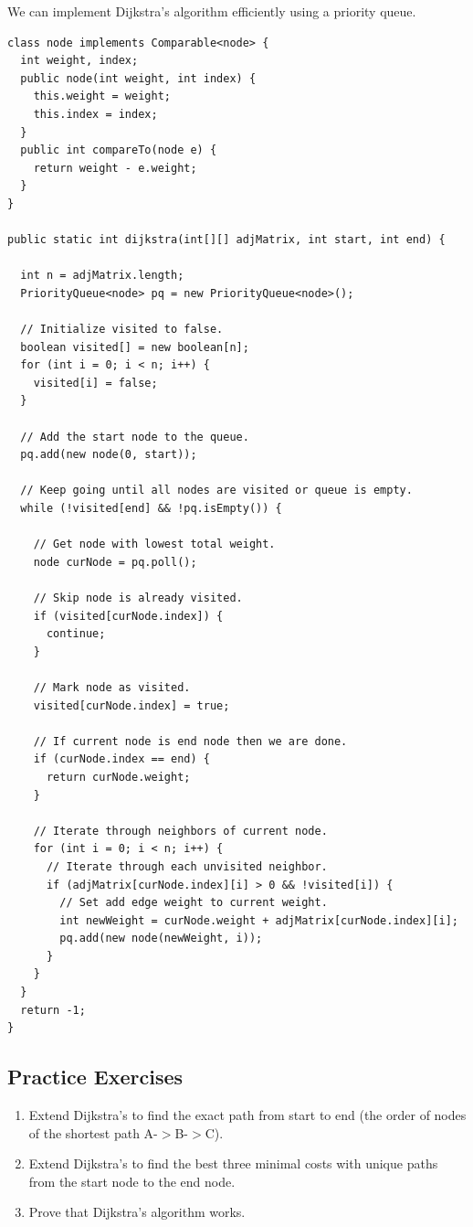 \documentclass[11pt,oneside]{book}
\begin{document}
We can implement Dijkstra's algorithm efficiently using a priority queue.

\begin{lstlisting}
class node implements Comparable<node> {
  int weight, index;
  public node(int weight, int index) {
    this.weight = weight;
    this.index = index;
  }
  public int compareTo(node e) {
    return weight - e.weight;
  }
}

public static int dijkstra(int[][] adjMatrix, int start, int end) {

  int n = adjMatrix.length;
  PriorityQueue<node> pq = new PriorityQueue<node>();

  // Initialize visited to false.
  boolean visited[] = new boolean[n];
  for (int i = 0; i < n; i++) {
    visited[i] = false;
  }

  // Add the start node to the queue.
  pq.add(new node(0, start));

  // Keep going until all nodes are visited or queue is empty.
  while (!visited[end] && !pq.isEmpty()) {

    // Get node with lowest total weight.
    node curNode = pq.poll();

    // Skip node is already visited.
    if (visited[curNode.index]) {
      continue;
    }

    // Mark node as visited.
    visited[curNode.index] = true;

    // If current node is end node then we are done.
    if (curNode.index == end) {
      return curNode.weight;
    }

    // Iterate through neighbors of current node.
    for (int i = 0; i < n; i++) {
      // Iterate through each unvisited neighbor.
      if (adjMatrix[curNode.index][i] > 0 && !visited[i]) {
        // Set add edge weight to current weight.
        int newWeight = curNode.weight + adjMatrix[curNode.index][i];
        pq.add(new node(newWeight, i));
      }
    }
  }
  return -1;
}
\end{lstlisting}

\subsection{Practice Exercises}

\begin{enumerate}
\item Extend Dijkstra's to find the exact path from start to end (the order of nodes of the shortest path A-$>$B-$>$C).
\item Extend Dijkstra's to find the best three minimal costs with unique paths from the start node to the end node.
\item Prove that Dijkstra's algorithm works.
\end{enumerate}
\end{document}
